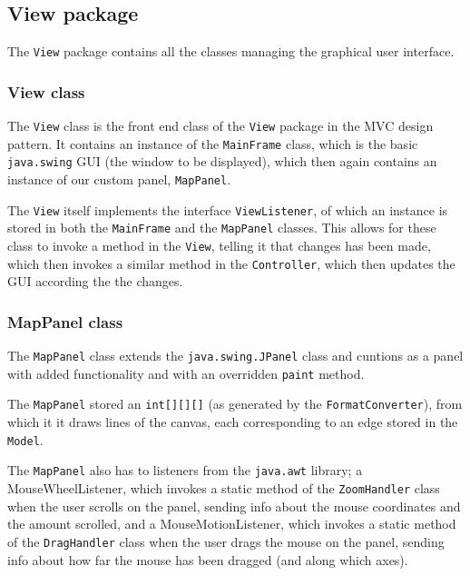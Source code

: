 \documentclass[a4paper,11pt]{article}
\begin{document}
\subsection{View package} %
The \texttt{View} package contains all the classes managing the graphical user interface.

\subsubsection{View class} %
The \texttt{View} class is the front end class of the \texttt{View} package in the MVC design pattern. It contains an instance of the \texttt{MainFrame} class, which is the basic \texttt{java.swing} GUI (the window to be displayed), which then again contains an instance of our custom panel, \texttt{MapPanel}.

The \texttt{View} itself implements the interface \texttt{ViewListener}, of which an instance is stored in both the \texttt{MainFrame} and the \texttt{MapPanel} classes. This allows for these class to invoke a method in the \texttt{View}, telling it that changes has been made, which then invokes a similar method in the \texttt{Controller}, which then updates the GUI according the the changes.

\subsubsection{MapPanel class} %
The \texttt{MapPanel} class extends the \texttt{java.swing.JPanel} class and cuntions as a panel with added functionality and with an overridden \texttt{paint} method.

The \texttt{MapPanel} stored an \texttt{int[][][]} (as generated by the \texttt{FormatConverter}), from which it it draws lines of the canvas, each corresponding to an edge stored in the \texttt{Model}.

The \texttt{MapPanel} also has to listeners from the \texttt{java.awt} library; a MouseWheelListener, which invokes a static method of the \texttt{ZoomHandler} class when the user scrolls on the panel, sending info about the mouse coordinates and the amount scrolled, and a MouseMotionListener, which invokes a static method of the \texttt{DragHandler} class when the user drags the mouse on the panel, sending info about how far the mouse has been dragged (and along which axes).
\end{document}

